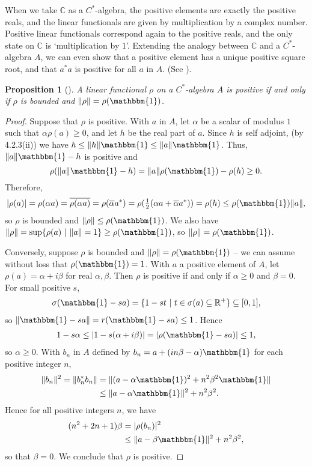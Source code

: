 \documentclass[12pt,a4paper]{report}
\theoremstyle{plain}
\newtheorem{prop}{Proposition}
\theoremstyle{definition}
\newcommand{\1}{\mathbbm{1}}
\newcommand{\C}{\mathbb{C}}
\newcommand{\R}{\mathbb{R}}
\newcommand{\spec}[1]{\sigma(#1)}
\begin{document}
When we take $\C$ as a $C^\ast$-algebra, the positive elements are exactly the positive reals, and the 
linear functionals are given by multiplication by a complex number. Positive linear functionals 
correspond again to the positive reals, and the only state on $\C$ is `multiplication by $1$'.
Extending the analogy between $\C$ and a $C^\ast$-algebra $A$, we can even show that a positive element has a unique positive square root, and that $a^\ast a$ is positive for all $a$ in $A$. (See \cite[4.2.5 and 4.2.6]{kadison83}).


\begin{prop}[{\cite[4.3.2]{kadison83}}]\label{prop:432}
	A linear functional $\rho$ on a $C^\ast$-algebra $A$ is positive if and only if $\rho$ is bounded
	and $\|\rho\| = \rho(\1)$.
\end{prop}
\begin{proof}
	Suppose that $\rho$ is positive. With $a$ in $A$, let $\alpha$ be a scalar of modulus $1$ 
	such that $\alpha\rho(a)\geq 0$, and let $h$ be the real part of $a$.
	Since $h$ is self adjoint, (by 4.2.3(ii)) we have $h \leq \|h\|\1 \leq \|a\|\1$. Thus, $\|a\|\1-h$
	is positive and 
	\[
		\rho(\|a\|\1-h) = \|a\|\rho(\1)-\rho(h) \geq 0.
	\]
	Therefore,
	\begin{align*}
		|\rho(a)| = \rho(\alpha a) = \overline{\rho(\alpha a)} = \rho(\overline{\alpha}a^\ast) = 
					\rho(\tfrac{1}{2}(\alpha a +\overline{\alpha}a^\ast)) =
					\rho(h) \leq \rho(\1) \|a\|,
	\end{align*}
	so $\rho$ is bounded and $\|\rho\| \leq \rho(\1)$. We also have $\|\rho\| = \sup\{\rho(a)~|~\|a\|=
	1\} \geq \rho(\1)$, so $\|\rho\|=\rho(\1)$.
	
	Conversely, suppose $\rho$ is bounded and $\|\rho\| = \rho(\1)$ -- we can assume without loss that 
	$\rho(\1)=1$. With $a$ a positive element of $A$, let $\rho(a)=\alpha+i\beta$ for real $\alpha
	,\beta$. Then $\rho$ is positive if and only if $\alpha \geq 0$ and $\beta =0$.
	For small positive $s$, 
	\begin{align*}
		\spec{\1-sa} = \{1-st ~|~ t\in \spec{a} \subseteq \R^+\} \subseteq [0,1],
	\end{align*}
	so $\|\1-sa\| = r(\1-sa) \leq 1$. Hence
	\begin{align*}
		1-s\alpha \leq |1-s(\alpha+i\beta)| = |\rho(\1 - sa)| \leq 1,
	\end{align*}
	so $\alpha\geq0$. With $b_n$ in $A$ defined by $b_n= a+(in\beta-\alpha)\1$ for each positive
	integer $n$,
	\begin{align*}
				\|b_n\|^2 = \|b_n^\ast b_n\| 
		&= 		\|(a-\alpha\1)^2 + n^2\beta^2\1\| 									\\
		&\leq 	\|a-\alpha\1\|^2 +n^2\beta^2.
	\end{align*}
	Hence for all positive integers $n$, we have
	\begin{align*}
				(n^2+2n+1)\beta 
		&=	 	|\rho(b_n)|^2  														\\
		&\leq 	\|a-\beta\1\|^2 +n^2\beta^2,
	\end{align*}
	so that $\beta=0$. We conclude that $\rho$ is positive.
\end{proof}
\end{document}
